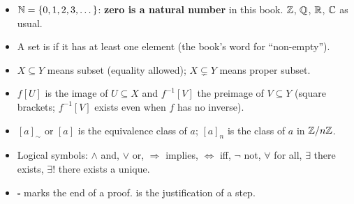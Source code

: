 \begin{key}
\begin{itemize}
\item $\mathbb{N}=\{0,1,2,3,\dots\}$: \textbf{zero is a natural number} in this book. $\mathbb{Z}$, $\mathbb{Q}$, $\mathbb{R}$, $\mathbb{C}$ as usual.
\item A set is  if it has at least one element (the book's word for ``non-empty'').
\item $X\subseteq Y$ means subset (equality allowed); $X\subsetneq Y$ means proper subset.
\item $f[U]$ is the image of $U\subseteq X$ and $f^{-1}[V]$ the preimage of $V\subseteq Y$ (square brackets; $f^{-1}[V]$ exists even when $f$ has no inverse).
\item $[a]_\sim$ or $[a]$ is the equivalence class of $a$; $[a]_n$ is the class of $a$ in $\mathbb{Z}/n\mathbb{Z}$.
\item Logical symbols: $\wedge$ and, $\vee$ or, $\Rightarrow$ implies, $\Leftrightarrow$ iff, $\neg$ not, $\forall$ for all, $\exists$ there exists, $\exists!$ there exists a unique.
\item $\square$ marks the end of a proof.  is the justification of a step.
\end{itemize}
\end{key}

